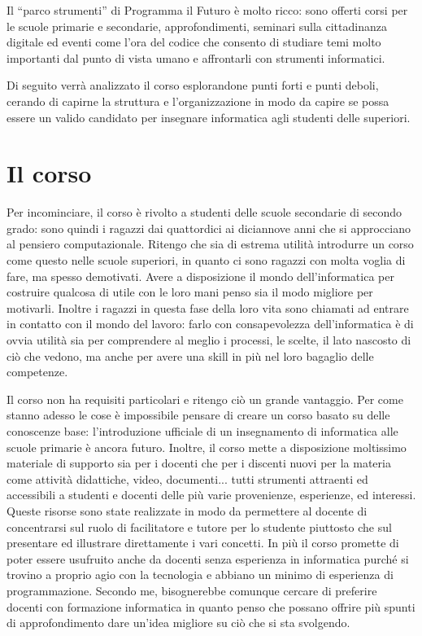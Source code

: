 \documentclass[11pt,a4paper]{article}
\begin{document}
Il ``parco strumenti'' di Programma il Futuro è molto ricco: sono offerti
corsi per le scuole primarie e secondarie, approfondimenti, seminari
sulla cittadinanza digitale ed eventi come l'ora del codice che
consento di studiare temi molto importanti dal punto di vista umano
e affrontarli con strumenti informatici.

Di seguito verrà analizzato il corso esplorandone punti forti e punti
deboli, cerando di capirne la struttura e l'organizzazione in modo
da capire se possa essere un valido candidato per insegnare
informatica agli studenti delle superiori.

\section{Il corso}

Per incominciare, il corso è rivolto a studenti delle scuole
secondarie di secondo grado: sono quindi i ragazzi dai quattordici ai
diciannove anni che si approcciano al pensiero computazionale. Ritengo
che sia di estrema utilità introdurre un corso come questo nelle
scuole superiori, in quanto ci sono ragazzi con molta voglia di fare,
ma spesso demotivati. Avere a disposizione il mondo dell'informatica
per costruire qualcosa di utile con le loro mani penso sia il modo
migliore per motivarli. Inoltre i ragazzi in questa fase della loro
vita sono chiamati ad entrare in contatto con il mondo del lavoro:
farlo con consapevolezza dell'informatica è di ovvia utilità sia per
comprendere al meglio i processi, le scelte, il lato nascosto di ciò
che vedono, ma anche per avere una skill in più nel loro bagaglio
delle competenze.

Il corso non ha requisiti particolari e ritengo ciò un grande
vantaggio. Per come stanno adesso le cose è impossibile pensare di
creare un corso basato su delle conoscenze base: l'introduzione
ufficiale di un insegnamento di informatica alle scuole primarie è
ancora futuro. Inoltre, il corso mette a disposizione moltissimo
materiale di supporto sia per i docenti che per i discenti nuovi per
la materia come attività didattiche,
video, documenti... tutti strumenti attraenti ed accessibili a
studenti e docenti delle più varie provenienze, esperienze, ed
interessi. Queste risorse sono state realizzate in modo da permettere
al docente di concentrarsi sul ruolo di facilitatore e tutore per lo
studente piuttosto che sul presentare ed illustrare direttamente i
vari concetti. In più il corso promette di poter essere usufruito
anche da docenti senza esperienza in informatica purché si trovino a
proprio agio con la tecnologia e abbiano un minimo di esperienza di
programmazione. Secondo me, bisognerebbe comunque cercare di preferire
docenti con formazione informatica in quanto penso che possano offrire
più spunti di approfondimento dare un'idea migliore su ciò che si sta
svolgendo.
\end{document}
